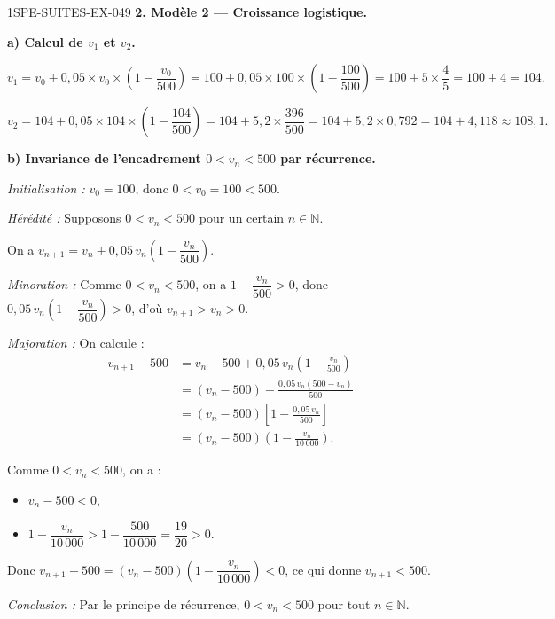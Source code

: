 \begin{corrige}{1SPE-SUITES-EX-049}
\textbf{2. Modèle 2 — Croissance logistique.}

\textbf{a) Calcul de $v_1$ et $v_2$.}

\[
v_1 = v_0 + 0{,}05 \times v_0 \times \left(1 - \frac{v_0}{500}\right) = 100 + 0{,}05 \times 100 \times \left(1 - \frac{100}{500}\right) = 100 + 5 \times \frac{4}{5} = 100 + 4 = 104.
\]

\[
v_2 = 104 + 0{,}05 \times 104 \times \left(1 - \frac{104}{500}\right) = 104 + 5{,}2 \times \frac{396}{500} = 104 + 5{,}2 \times 0{,}792 = 104 + 4{,}118 \approx 108{,}1.
\]

\textbf{b) Invariance de l'encadrement $0 < v_n < 500$ par récurrence.}


\textit{Initialisation :} $v_0 = 100$, donc $0 < v_0 = 100 < 500$. \checkmark

\textit{Hérédité :} Supposons $0 < v_n < 500$ pour un certain $n \in \mathbb{N}$.

On a $v_{n+1} = v_n + 0{,}05\,v_n\!\left(1 - \dfrac{v_n}{500}\right)$.

\textit{Minoration :} Comme $0 < v_n < 500$, on a $1 - \dfrac{v_n}{500} > 0$, donc $0{,}05\,v_n\!\left(1 - \dfrac{v_n}{500}\right) > 0$, d'où $v_{n+1} > v_n > 0$.

\textit{Majoration :} On calcule :
\begin{align*}
v_{n+1} - 500 &= v_n - 500 + 0{,}05\,v_n\left(1 - \frac{v_n}{500}\right) \\
&= (v_n - 500) + \frac{0{,}05\,v_n(500 - v_n)}{500} \\
&= (v_n - 500)\left[1 - \frac{0{,}05\,v_n}{500}\right] \\
&= (v_n - 500)\left(1 - \frac{v_n}{10\,000}\right).
\end{align*}

Comme $0 < v_n < 500$, on a :
\begin{itemize}
  \item $v_n - 500 < 0$,
  \item $1 - \dfrac{v_n}{10\,000} > 1 - \dfrac{500}{10\,000} = \dfrac{19}{20} > 0$.
\end{itemize}

Donc $v_{n+1} - 500 = (v_n - 500)\!\left(1 - \dfrac{v_n}{10\,000}\right) < 0$, ce qui donne $v_{n+1} < 500$. \checkmark

\textit{Conclusion :} Par le principe de récurrence, $0 < v_n < 500$ pour tout $n \in \mathbb{N}$.


\end{corrige}

